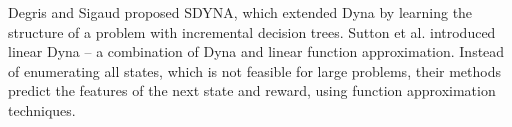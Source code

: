 


Degris and Sigaud \cite{ApproxTree} proposed SDYNA, which extended Dyna \cite{Dyna} by
learning the structure of a problem with incremental decision trees.
Sutton et al. \cite{ApproxDyna} introduced linear Dyna -- a combination 
of Dyna and linear function approximation. 
Instead of enumerating all states, which is not feasible for large problems,
their methods predict the features of the next state and reward, using function approximation
techniques. 


